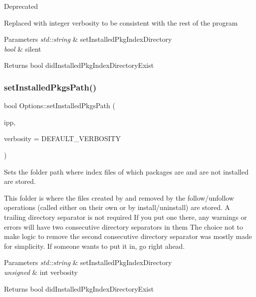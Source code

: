 \begin{DoxyRefDesc}{Deprecated}
\item[\mbox{\hyperlink{deprecated__deprecated000013}{Deprecated}}]Replaced with integer verbosity to be consistent with the rest of the program\end{DoxyRefDesc}



\begin{DoxyParams}{Parameters}
{\em std\+::string} & set\+Installed\+Pkg\+Index\+Directory \\
\hline
{\em bool} & silent\\
\hline
\end{DoxyParams}
\begin{DoxyReturn}{Returns}
bool did\+Installed\+Pkg\+Index\+Directory\+Exist 
\end{DoxyReturn}
\mbox{\label{classOptions_acd4bb01ae1876bf7cc2bfdb0743ba668}} 
\subsubsection{\texorpdfstring{setInstalledPkgsPath()}{setInstalledPkgsPath()}\hspace{0.1cm}{\footnotesize\ttfamily [2/2]}}
{\footnotesize\ttfamily bool Options\+::set\+Installed\+Pkgs\+Path (\begin{DoxyParamCaption}\item[{std\+::string}]{ipp,  }\item[{unsigned int}]{verbosity = {\ttfamily DEFAULT\+\_\+VERBOSITY} }\end{DoxyParamCaption})}



Sets the folder path where index files of which packages are and are not installed are stored. 

This folder is where the files created by and removed by the follow/unfollow operations (called either on their own or by install/uninstall) are stored. A trailing directory separator is not required If you put one there, any warnings or errors will have two consecutive directory separators in them The choice not to make logic to remove the second consecutive directory separator was mostly made for simplicity. If someone wants to put it in, go right ahead.


\begin{DoxyParams}{Parameters}
{\em std\+::string} & set\+Installed\+Pkg\+Index\+Directory \\
\hline
{\em unsigned} & int verbosity\\
\hline
\end{DoxyParams}
\begin{DoxyReturn}{Returns}
bool did\+Installed\+Pkg\+Index\+Directory\+Exist 
\end{DoxyReturn}
\mbox{\label{classOptions_a430e86a75207637213cf868126f9bad3}} 
